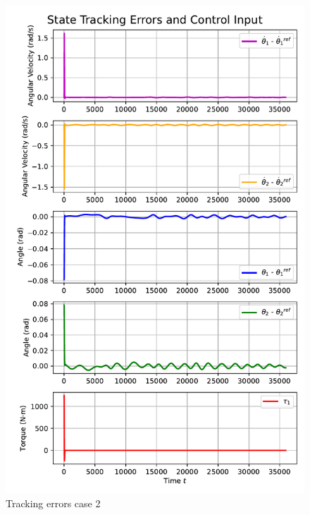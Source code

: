 \begin{figure}[htb]
    \centering
    \includegraphics[width=1\linewidth]{img/3-task3/LQR2_errors.pdf}
    \caption{Tracking errors case 2}
    \label{fig:dtheta1-evolution}
\end{figure}


